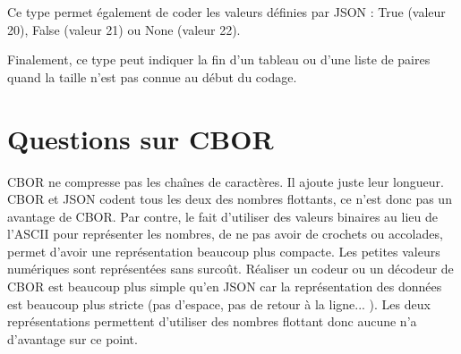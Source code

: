 Ce type permet également de coder les valeurs définies par JSON : True (valeur 20), False (valeur 21) ou None (valeur 22).

Finalement, ce type peut indiquer la fin d'un tableau ou d'une liste de paires quand la taille n'est pas connue au début du codage.

\section{Questions sur CBOR}
{
CBOR ne compresse pas les chaînes de caractères. Il ajoute juste leur longueur. CBOR et JSON codent tous les deux des nombres flottants, ce n'est donc pas un avantage de CBOR. Par contre, le fait d'utiliser des valeurs binaires au lieu de l'ASCII pour représenter les nombres, de ne pas avoir de crochets ou accolades, permet d'avoir une représentation beaucoup plus compacte. Les petites valeurs numériques sont représentées sans surcoût. Réaliser un codeur ou un décodeur de CBOR est beaucoup plus simple qu'en JSON car la représentation des données est beaucoup plus stricte (pas d'espace, pas de retour à la ligne... ). Les deux représentations permettent d'utiliser des nombres flottant donc aucune n'a d'avantage sur ce point.
}


